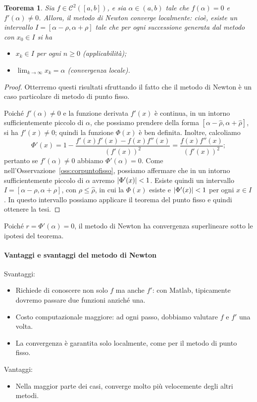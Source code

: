 \documentclass[a4paper]{report}
\DeclarePairedDelimiter{\abs}{\lvert}{\rvert}
\newtheorem{theorem}{Teorema}[chapter]
\theoremstyle{definition}
\theoremstyle{remark}
\begin{document}
\begin{theorem}
Sia $f \in \mathcal{C}^2([a,b])$, e sia $\alpha \in (a,b)$ tale che $f(\alpha) = 0$ e $f'(\alpha) \neq 0$. Allora, il metodo di Newton converge localmente: cioè, esiste un intervallo $I = [\alpha - \rho,\alpha + \rho]$ tale che per ogni successione generata dal metodo con $x_0 \in I$ si ha
\begin{itemize}
    \item $x_k \in I$ per ogni $n\geq 0$ (applicabilità);
    \item $\lim_{k\to \infty } x_k = \alpha$ (convergenza locale).
\end{itemize}
\end{theorem}
\begin{proof}
Otterremo questi risultati sfruttando il fatto che il metodo di Newton è un caso particolare di metodo di punto fisso.

Poiché $f'(\alpha) \neq 0$ e la funzione derivata $f'(x)$ è continua, in un intorno sufficientemente piccolo di $\alpha$, che possiamo prendere della forma $[\alpha-\hat{\rho}, \alpha+\hat{\rho}]$, si ha $f'(x) \neq 0$; quindi la funzione $\Phi(x)$ è ben definita. Inoltre, calcoliamo
\begin{equation} \label{Phiprime}
    \Phi'(x) = 1 - \frac{f'(x)f'(x) - f(x)f''(x)}{(f'(x))^2} = \frac{f(x)f''(x)}{(f'(x))^2};
\end{equation}
pertanto se $f'(\alpha) \neq 0$ abbiamo $\Phi'(\alpha) = 0$. Come nell'Osservazione~\ref{oss:corpuntofisso}, possiamo affermare che in un intorno sufficientemente piccolo di $\alpha$ avremo $\abs{\Phi'(x)} < 1$. Esiste quindi un intervallo $I = [\alpha-\rho,\alpha+\rho]$, con $\rho\leq \hat{\rho}$, in cui la $\Phi(x)$ esiste e $\abs{\Phi'(x)} < 1$ per ogni $x\in I$. In questo intervallo possiamo applicare il teorema del punto fisso e quindi ottenere la tesi.
\end{proof}
Poiché $r = \Phi'(\alpha)=0$, il metodo di Newton ha convergenza superlineare sotto le ipotesi del teorema.

\paragraph{Vantaggi e svantaggi del metodo di Newton}
Svantaggi:
\begin{itemize}
    \item Richiede di conoscere non solo $f$ ma anche $f'$: con Matlab, tipicamente dovremo passare due funzioni anziché una.
    \item Costo computazionale maggiore: ad ogni passo, dobbiamo valutare $f$ e $f'$ una volta.
    \item La convergenza è garantita solo localmente, come per il metodo di punto fisso.
\end{itemize}
Vantaggi:
\begin{itemize}
    \item Nella maggior parte dei casi, converge molto più velocemente degli altri metodi.
\end{itemize}
\end{document}

